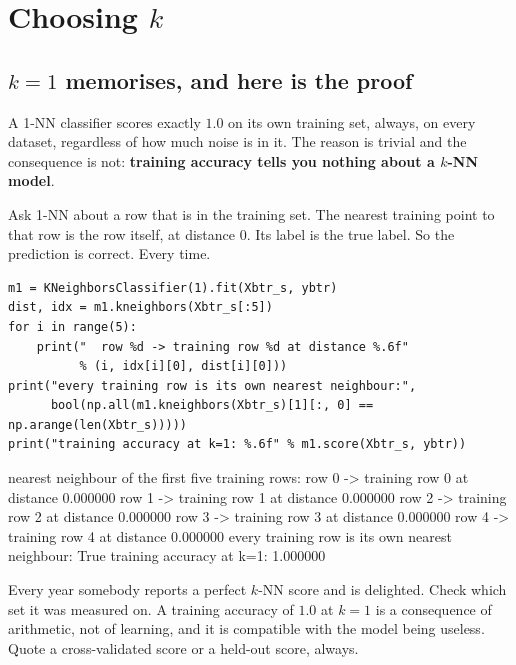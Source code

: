 \documentclass[11pt]{article}
\begin{document}
\section{Choosing $k$}
\label{sec:k}

\subsection{$k=1$ memorises, and here is the proof}
\label{sec:memorise}

\begin{keyidea}
A 1-NN classifier scores exactly $1.0$ on its own training set, always, on
every dataset, regardless of how much noise is in it. The reason is trivial and
the consequence is not: \textbf{training accuracy tells you nothing about a
$k$-NN model}.
\end{keyidea}

Ask 1-NN about a row that is in the training set. The nearest training point to
that row is the row itself, at distance $0$. Its label is the true label. So
the prediction is correct. Every time.

\begin{lstlisting}
m1 = KNeighborsClassifier(1).fit(Xbtr_s, ybtr)
dist, idx = m1.kneighbors(Xbtr_s[:5])
for i in range(5):
    print("  row %d -> training row %d at distance %.6f"
          % (i, idx[i][0], dist[i][0]))
print("every training row is its own nearest neighbour:",
      bool(np.all(m1.kneighbors(Xbtr_s)[1][:, 0] == np.arange(len(Xbtr_s)))))
print("training accuracy at k=1: %.6f" % m1.score(Xbtr_s, ybtr))
\end{lstlisting}
\begin{codeout}
nearest neighbour of the first five training rows:
  row 0 -> training row 0 at distance 0.000000
  row 1 -> training row 1 at distance 0.000000
  row 2 -> training row 2 at distance 0.000000
  row 3 -> training row 3 at distance 0.000000
  row 4 -> training row 4 at distance 0.000000
every training row is its own nearest neighbour: True
training accuracy at k=1: 1.000000
\end{codeout}

\begin{caution} %
Every year somebody reports a perfect $k$-NN score and is delighted. Check
which set it was measured on. A training accuracy of $1.0$ at $k=1$ is a
consequence of arithmetic, not of learning, and it is compatible with the model
being useless. Quote a cross-validated score or a held-out score, always.
\end{caution}
\end{document}
